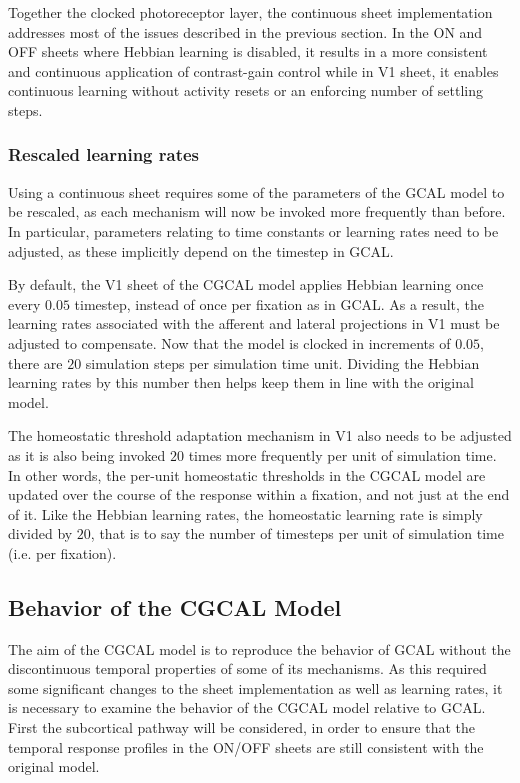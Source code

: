 \documentclass[phd,ianc,twoside]{infthesis}
\begin{document}
Together the clocked photoreceptor layer, the continuous sheet
implementation addresses most of the issues described in the previous
section. In the ON and OFF sheets where Hebbian learning is disabled, it
results in a more consistent and continuous application of contrast-gain
control while in V1 sheet, it enables continuous learning without
activity resets or an enforcing number of settling steps.

\subsubsection*{Rescaled learning rates}

Using a continuous sheet requires some of the parameters of the GCAL
model to be rescaled, as each mechanism will now be invoked more
frequently than before. In particular, parameters relating to time
constants or learning rates need to be adjusted, as these implicitly
depend on the timestep in GCAL.

By default, the V1 sheet of the CGCAL model applies Hebbian learning
once every $0.05$ timestep, instead of once per fixation as in GCAL. As
a result, the learning rates associated with the afferent and lateral
projections in V1 must be adjusted to compensate. Now that the model is
clocked in increments of $0.05$, there are $20$ simulation steps per
simulation time unit. Dividing the Hebbian learning rates by this number
then helps keep them in line with the original model.

The homeostatic threshold adaptation mechanism in V1 also needs to be
adjusted as it is also being invoked $20$ times more frequently per unit
of simulation time. In other words, the per-unit homeostatic thresholds
in the CGCAL model are updated over the course of the response within a
fixation, and not just at the end of it. Like the Hebbian learning
rates, the homeostatic learning rate is simply divided by $20$, that is
to say the number of timesteps per unit of simulation time (i.e. per
fixation).


\subsection{Behavior of the CGCAL Model}

The aim of the CGCAL model is to reproduce the behavior of GCAL without
the discontinuous temporal properties of some of its mechanisms. As this
required some significant changes to the sheet implementation as well as
learning rates, it is necessary to examine the behavior of the CGCAL
model relative to GCAL. First the subcortical pathway will be considered,
in order to ensure that the temporal response profiles in the ON/OFF
sheets are still consistent with the original model.
\end{document}
